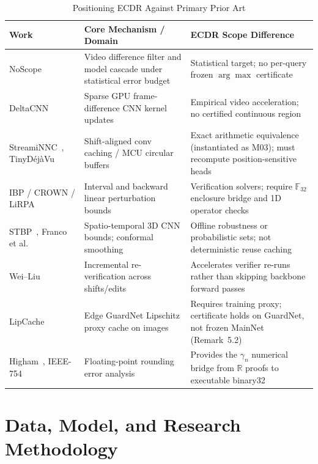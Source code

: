 \documentclass[11pt,oneside,a4paper]{report}
\newcommand{\R}{\mathbb{R}}
\newcommand{\F}{\mathbb{F}}
\newcommand{\code}[1]{{\small\upshape\ttfamily #1}}
\theoremstyle{remark}
\begin{document}
\begin{table}[htbp]
\centering\small
\caption{Positioning ECDR Against Primary Prior Art}
\label{tab:related_work}
\begin{tabularx}{\textwidth}{@{}P{3.6cm}YY@{}}
\toprule
\textbf{Work} & \textbf{Core Mechanism / Domain} & \textbf{ECDR Scope Difference} \\
\midrule
NoScope~\cite{kang2017noscope} & Video difference filter and model cascade under statistical error budget & Statistical target; no per-query frozen $\arg\max$ certificate \\
DeltaCNN~\cite{parger2022deltacnn} & Sparse GPU frame-difference CNN kernel updates & Empirical video acceleration; no certified continuous region \\
StreamiNNC~\cite{streaminnc}, TinyD\'ej\`aVu~\cite{tinydejavu} & Shift-aligned conv caching / MCU circular buffers & Exact arithmetic equivalence (instantiated as \code{M03}); must recompute position-sensitive heads \\
IBP / CROWN / LiRPA~\cite{gowal2018ibp,zhang2018crown,xu2020automatic} & Interval and backward linear perturbation bounds & Verification solvers; require $\F_{32}$ enclosure bridge and 1D operator checks \\
STBP~\cite{varghese2026stbp}, Franco et al.~\cite{franco2024conformalized} & Spatio-temporal 3D CNN bounds; conformal smoothing & Offline robustness or probabilistic sets; not deterministic reuse caching \\
Wei--Liu~\cite{wei2021online} & Incremental re-verification across shifts/edits & Accelerates verifier re-runs rather than skipping backbone forward passes \\
LipCache~\cite{xiang2026lipcache} & Edge \code{GuardNet} Lipschitz proxy cache on images & Requires training proxy; certificate holds on \code{GuardNet}, not frozen \code{MainNet} (Remark~5.2) \\
Higham~\cite{higham2002}, IEEE-754~\cite{ieee754} & Floating-point rounding error analysis & Provides the $\gamma_n$ numerical bridge from $\R$ proofs to executable \code{binary32} \\
\bottomrule
\end{tabularx}
\end{table}

\chapter{Data, Model, and Research Methodology}
\end{document}
